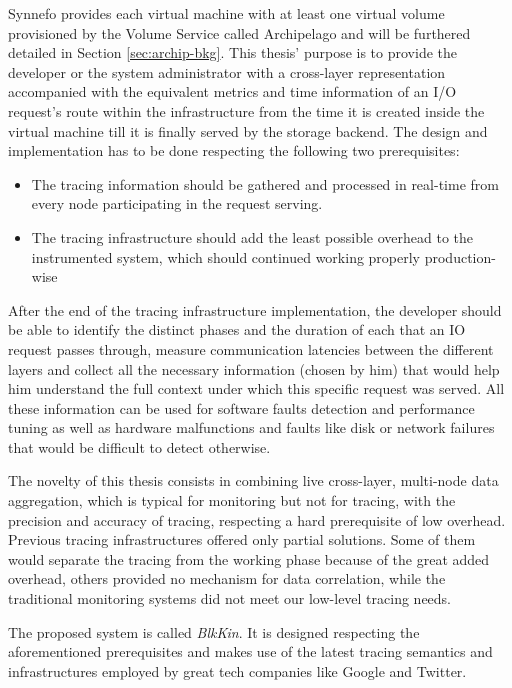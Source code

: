 Synnefo provides each virtual machine with at least one virtual volume
provisioned by the Volume Service called Archipelago\cite{archip-paper} and will
be furthered detailed in Section \ref{sec:archip-bkg}. This thesis' purpose is
to provide the developer or the system administrator with a cross-layer
representation accompanied with the equivalent metrics and time information of
an I/O request's route within the infrastructure from the time it is created
inside the virtual machine till it is finally served by the storage backend. The
design and implementation has to be done respecting the following two
prerequisites:

\begin{itemize}
    \item The tracing information should be gathered and processed in real-time
        from every node participating in the request serving.
    \item The tracing infrastructure should add the least possible overhead to
        the instrumented system, which should continued working properly 
        production-wise
\end{itemize}

After the end of the tracing infrastructure implementation, the developer should
be able to identify the distinct phases and the duration of each that an IO
request passes through, measure communication latencies between the different
layers and collect all the necessary information (chosen by him) that would help
him understand the full context under which this specific request was served.
All these information can be used for software faults detection and performance
tuning as well as hardware malfunctions and faults like disk or network failures
that would be difficult to detect otherwise.

The novelty of this thesis consists in combining live cross-layer, multi-node
data aggregation, which is typical for monitoring but not for tracing, with the
precision and accuracy of tracing, respecting a hard prerequisite of low
overhead. Previous tracing infrastructures offered only partial solutions. Some
of them would separate the tracing from the working phase because of the great
added overhead, others provided no mechanism for data correlation, while the
traditional monitoring systems did not meet our low-level tracing needs.

The proposed system is called \textit{BlkKin}. It is designed respecting the
aforementioned prerequisites and makes use of the latest tracing semantics and
infrastructures employed by great tech companies like Google and Twitter.  

